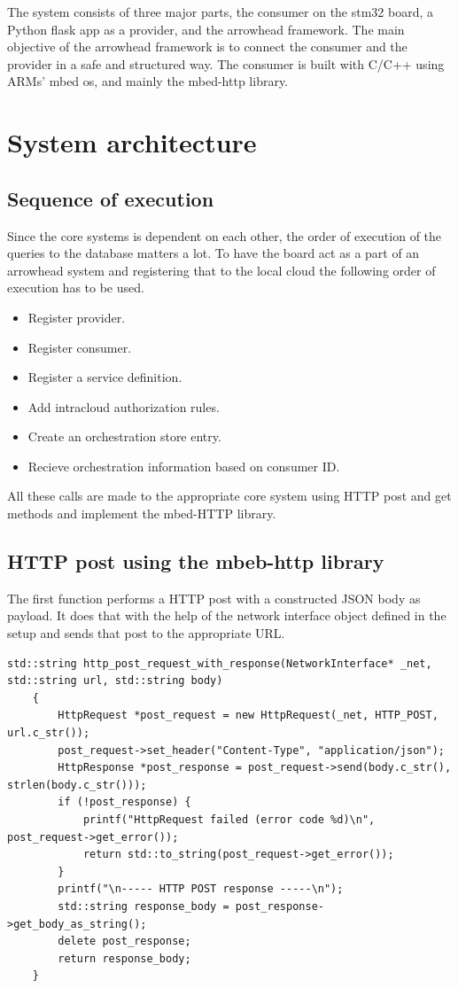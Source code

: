 The system consists of three major parts, the consumer on the stm32 board, a Python flask app as a provider, and the arrowhead framework.
The main objective of the arrowhead framework is to connect the consumer and the provider in a safe and structured way.
The consumer is built with C/C++ using ARMs' mbed os, and mainly the mbed-http library. 

\section{System architecture}
\subsection{Sequence of execution}
Since the core systems is dependent on each other, the order of execution of the queries to the database matters a lot.
To have the board act as a part of an arrowhead system and registering that to the local cloud the following order of execution has to be used.
\begin{itemize}
    \item Register provider.
    \item Register consumer.
    \item Register a service definition.
    \item Add intracloud authorization rules.
    \item Create an orchestration store entry.
    \item Recieve orchestration information based on consumer ID.
\end{itemize}

All these calls are made to the appropriate core system using HTTP post and get methods and implement the mbed-HTTP library.
\subsection{HTTP post using the mbeb-http library}
The first function performs a HTTP post with a constructed JSON body as payload.
It does that with the help of the network interface object defined in the setup and sends that post to the appropriate URL.
\begin{lstlisting}[style=CStyle]
    std::string http_post_request_with_response(NetworkInterface* _net, std::string url, std::string body)
    {
        HttpRequest *post_request = new HttpRequest(_net, HTTP_POST, url.c_str());
        post_request->set_header("Content-Type", "application/json");
        HttpResponse *post_response = post_request->send(body.c_str(), strlen(body.c_str()));
        if (!post_response) {
            printf("HttpRequest failed (error code %d)\n", post_request->get_error());
            return std::to_string(post_request->get_error());
        }
        printf("\n----- HTTP POST response -----\n");
        std::string response_body = post_response->get_body_as_string();
        delete post_response;
        return response_body;
    }
\end{lstlisting}
